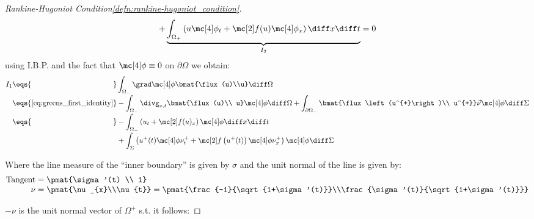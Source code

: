 \begin{proofbox}
\begin{proof}[Rankine-Hugoniot Condition\cref{defn:rankine-hugoniot_condition}]
\begin{align*}
            +\underbrace{\int_{\Omega_{+}}\left(u\testfunc_{t}+\flux(u)\testfunc_{x}\right)\diff x \diff t}_{I_{2}}=0
        \end{align*}
        using I.B.P. and the fact that $\testfunc\equiv0$ on $\partial\Omega$ we obtain:
        \begin{align*}
          I_{1}\eqs{\hphantom{\text{\cref{eq:greens_first_identity}}}}&\int_{\Omega_{-}}\grad\testfunc\bmat{\flux(u)\\u}\diff\Omega \\[-1\jot]
               \eqs{\text{\cref{eq:greens_first_identity}}}&
                 -\int_{\Omega_{-}}\divg_{x,t}\bmat{\flux(u)\\ u}\testfunc\diff\Omega
                 +\int_{\partial\Omega_{-}}\bmat{\flux\left(u^{+}\right)\\ u^{+}}\vec{\nu}\testfunc\diff \Sigma
          \\[-1\jot]
               \eqs{\hphantom{\text{\cref{eq:greens_first_identity}}}}&
                 -\int_{\Omega_{-}}\left(u_{t}+\flux(u)_{x}\right)\testfunc\diff x\diff t \\[-1\jot]
               &+\int_{\Sigma}\left(u^{+}(t)\testfunc\nu_{t}^{+}+\flux \left(u^{+}(t)\right)\testfunc\nu_{x}^{+}\right)\testfunc\diff\Sigma
        \end{align*}
        \begin{minipage}[c]{0.3\textwidth}
            \begin{figure}[H]
                \centering{
                  \def\svgwidth{60pt}
                  \resizebox{\linewidth}{!}{}
                }
            \end{figure}
        \end{minipage}\hfill
        \begin{minipage}{0.65\textwidth}
            Where the line measure of the ``inner boundary'' is given by $\sigma$ and the unit normal of the line is given by:
            \begin{align*}
              \text{Tangent}&=\pmat{\sigma'(t) \\ 1}\\[-1\jot]
              \nu&=\pmat{\nu_{x}\\\nu{t}}=\pmat{\frac{-1}{\sqrt{1+\sigma'(t)}}\\\frac{\sigma'(t)}{\sqrt{1+\sigma'(t)}}}
            \end{align*}
        \end{minipage}
        $-\nu$ is the unit normal vector of $\Omega^{+}$ s.t. it follows:

\end{proof}
\end{proofbox}
